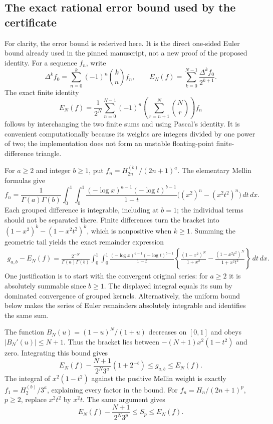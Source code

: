 \subsection{The exact rational error bound used by the certificate}

For clarity, the error bound is rederived here.  It is the direct
one-sided Euler bound already used in the pinned manuscript, not a
new proof of the proposed identity.  For a sequence $f_n$, write
\[
 \Delta^kf_0=\sum_{n=0}^k(-1)^n\binom{k}{n}f_n,
 \qquad
 E_N(f)=\sum_{k=0}^{N-1}\frac{\Delta^kf_0}{2^{k+1}}.
\]
The exact finite identity
\begin{equation}\label{oi:eq:euler-finite}
 E_N(f)=\frac1{2^N}\sum_{n=0}^{N-1}(-1)^n
 \left(\sum_{r=n+1}^{N}\binom Nr\right)f_n
\end{equation}
follows by interchanging the two finite sums and using Pascal's
identity.  It is convenient computationally because its weights are
integers divided by one power of two; the implementation does not
form an unstable floating-point finite-difference triangle.

For $a\geq2$ and integer $b\geq1$, put
$f_n=H_{2n}^{(b)}/(2n+1)^a$.  The elementary Mellin formulas give
\[
 f_n=\frac1{\Gamma(a)\Gamma(b)}
 \int_0^1\int_0^1
 \frac{(-\log x)^{a-1}(-\log t)^{b-1}}{1-t}
 \bigl((x^2)^n-(x^2t^2)^n\bigr)\,dt\,dx.
\]
Each grouped difference is integrable, including at $b=1$; the
individual terms should not be separated there.  Finite differences
turn the bracket into
$(1-x^2)^k-(1-x^2t^2)^k$, which is nonpositive when $k\geq1$.
Summing the geometric tail yields the exact remainder expression
\begin{align*}
 g_{a,b}-E_N(f)
 =\frac{2^{-N}}{\Gamma(a)\Gamma(b)}
 \int_0^1\int_0^1
 \frac{(-\log x)^{a-1}(-\log t)^{b-1}}{1-t}
 \left\{\frac{(1-x^2)^N}{1+x^2}
       -\frac{(1-x^2t^2)^N}{1+x^2t^2}\right\}\,dt\,dx.
\end{align*}
One justification is to start with the convergent original series:
for $a\geq2$ it is absolutely summable since $b\geq1$.  The displayed
integral equals its sum by dominated convergence of grouped kernels.
Alternatively, the uniform bound below makes the series of Euler
remainders absolutely integrable and identifies the same sum.

The function $B_N(u)=(1-u)^N/(1+u)$ decreases on $[0,1]$ and obeys
$|B_N'(u)|\leq N+1$.  Thus the bracket lies between
$-(N+1)x^2(1-t^2)$ and zero.  Integrating this bound gives
\begin{equation}\label{oi:eq:gaussian-bound}
 E_N(f)-\frac{N+1}{2^N3^a}\left(1+2^{-b}\right)
 \leq g_{a,b}\leq E_N(f).
\end{equation}
The integral of $x^2(1-t^2)$ against the positive Mellin weight is
exactly $f_1=H_2^{(b)}/3^a$, explaining every factor in the bound.
For $f_n=H_n/(2n+1)^p$, $p\geq2$, replace $x^2t^2$ by $x^2t$.
The same argument gives
\begin{equation}\label{oi:eq:mixed-bound}
 E_N(f)-\frac{N+1}{2^N3^p}\leq S_p\leq E_N(f).
\end{equation}

